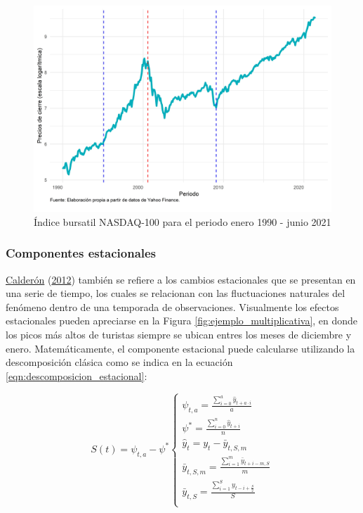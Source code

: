 \documentclass[
]{article}
\begin{document}
\begin{figure}[H]
\includegraphics[width=1\linewidth,height=1\textheight]{Tesis_files/figure-latex/ejemplo_ciclo-1} \caption{Índice bursatil NASDAQ-100 para el periodo enero 1990 - junio 2021}\label{fig:ejemplo_ciclo}
\end{figure}

\subsubsection{Componentes estacionales}

\protect\hyperlink{ref-calderon2012estadistica}{Calderón}
(\protect\hyperlink{ref-calderon2012estadistica}{2012}) también se
refiere a los cambios estacionales que se presentan en una serie de
tiempo, los cuales se relacionan con las fluctuaciones naturales del
fenómeno dentro de una temporada de observaciones. Visualmente los
efectos estacionales pueden apreciarse en la Figura
\ref{fig:ejemplo_multiplicativa}, en donde los picos más altos de
turistas siempre se ubican entres los meses de diciembre y enero.
Matemáticamente, el componente estacional puede calcularse utilizando la
descomposición clásica como se indica en la ecuación
\eqref{eqn:descomposicion_estacional}:

\begin{equation}
\label{eqn:descomposicion_estacional}
S(t)=\psi_{t,a}-\psi^*
\begin{cases}
\psi_{t,a} = \frac{\sum_{i=0}^a \hat{y}_{t+a\cdot i}}{a} \\
\psi^*=\frac{\sum_{i=0}^n \hat{y}_{t+i}}{n} \\
\hat{y}_t=y_t-\bar{y}_{t,S,m} \\
\bar{y}_{t,S,m}=\frac{\sum_{i=1}^m \bar{y}_{t+i-m,S}}{m} \\
\bar{y}_{t,S}=\frac{\sum_{i=1}^S y_{t-i+\frac{S}{2}}}{S} \\
\end{cases}
\end{equation}
\end{document}
